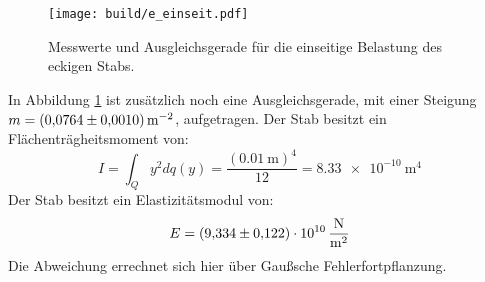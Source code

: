\begin{figure}[H]
    \centering
    \texttt{[image: build/e\_einseit.pdf]}
    \caption{Messwerte und Ausgleichsgerade für die einseitige Belastung des eckigen Stabs.}
    \label{fig:plot2}
\end{figure}
\noindent In Abbildung \ref{fig:plot2} ist zusätzlich noch eine Ausgleichsgerade, mit einer
Steigung $m=\SI[per-mode=reciprocal]{0.0764\pm0.001}{\per\meter\squared}$, aufgetragen.
Der Stab besitzt ein Flächenträgheitsmoment von:
\begin{equation*}
  I=\int_Q y^2 dq(y) = \frac{(\SI{0.01}{\meter})^4}{12} = \SI{8.33e-10}{\meter\tothe{4}}
\end{equation*}
Der Stab besitzt ein Elastizitätsmodul von:
\begin{equation*}
  E= \SI{9.334\pm0.122e10}{\newton\per\meter\squared}
\end{equation*}
Die Abweichung errechnet sich hier über Gaußsche Fehlerfortpflanzung.
%
